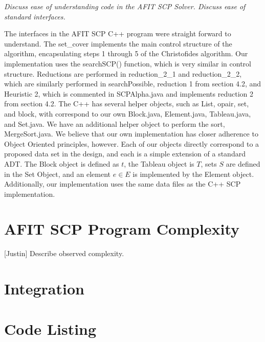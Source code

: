 \documentclass[12pt]{article}
\begin{document}
\textit{Discuss ease of understanding code in the AFIT SCP Solver. Discuss ease of standard interfaces.}

The interfaces in the AFIT SCP C++ program were straight forward to understand. The set\_cover implements the main control structure of the algorithm, encapsulating steps 1 through 5 of the Christofides algorithm. Our implementation uses the searchSCP() function, which is very similar in control structure. Reductions are performed in reduction\_2\_1 and reduction\_2\_2, which are similarly performed in searchPossible, reduction 1 from section 4.2, and Heuristic 2, which is commented in SCPAlpha.java and implements reduction 2 from section 4.2. The C++ has several helper objects, such as List, opair, set, and block, with correspond to our own Block.java, Element.java, Tableau.java, and Set.java. We have an additional helper object to perform the sort, MergeSort.java. We believe that our own implementation has closer adherence to Object Oriented principles, however. Each of our objects directly correspond to a proposed data set in the design, and each is a simple extension of a standard ADT. The Block object is defined as $t$, the Tableau object is $T$, sets $S$ are defined in the Set Object, and an element $e \in E$ is implemented by the Element object. Additionally, our implementation uses the same data files as the C++ SCP implementation.


\section{AFIT SCP Program Complexity} \label{scn:design}

[Justin] Describe observed complexity.

\section{Integration} \label{scn:design}



\pagebreak
\appendix		%

\section{Code Listing}










\end{document}
